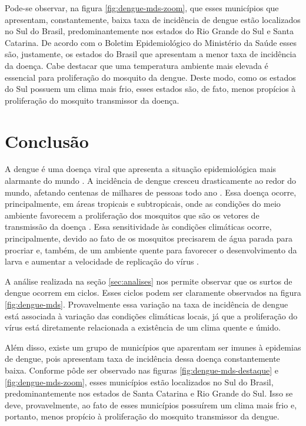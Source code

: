 \documentclass[12pt,openright,twoside,a4paper,article,brazil]{abntex2}
\begin{document}
Pode-se observar, na figura \ref{fig:dengue-mds-zoom}, que esses municípios que apresentam, constantemente, baixa taxa de incidência de dengue estão localizados no Sul do Brasil, predominantemente nos estados do Rio Grande do Sul e Santa Catarina. De acordo com o Boletim Epidemiológico do Ministério da Saúde esses são, justamente, os estados do Brasil que apresentam a menor taxa de incidência da doença\cite{ms-boletim-epidemiologico}. Cabe destacar que uma temperatura ambiente mais elevada é essencial para proliferação do mosquito da dengue\cite{effect-climate-dengue}. Deste modo, como os estados do Sul possuem um clima mais frio, esses estados são, de fato, menos propícios à proliferação do mosquito transmissor da doença.


\section{Conclusão}
\label{sec:conclusao}

A dengue é uma doença viral que apresenta a situação epidemiológica mais alarmante do mundo \cite{who-strategy-dengue-prevention}. A incidência de dengue cresceu drasticamente ao redor do mundo, afetando centenas de milhares de pessoas todo ano \cite{who-dengue-website}. Essa doença ocorre, principalmente, em áreas tropicais e subtropicais, onde as condições do meio ambiente favorecem a proliferação dos mosquitos que são os vetores de transmissão da doença \cite{ms-descricao-doenca}. Essa sensitividade às condições climáticas ocorre, principalmente, devido ao fato de os mosquitos precisarem de água parada para procriar e, também, de um ambiente quente para favorecer o desenvolvimento da larva e aumentar a velocidade de replicação do vírus \cite{effect-climate-dengue}.

A análise realizada na seção \ref{sec:analises} nos permite observar que os surtos de dengue ocorrem em ciclos. Esses ciclos podem ser claramente observados na figura \ref{fig:dengue-mds}. Provavelmente essa variação na taxa de incidência de dengue está associada à variação das condições climáticas locais, já que a proliferação do vírus está diretamente relacionada a existência de um clima quente e úmido.

Além disso, existe um grupo de municípios que aparentam ser imunes à epidemias de dengue, pois apresentam taxa de incidência dessa doença constantemente baixa. Conforme pôde ser observado nas figuras \ref{fig:dengue-mds-destaque} e \ref{fig:dengue-mds-zoom}, esses municípios estão localizados no Sul do Brasil, predominantemente nos estados de Santa Catarina e Rio Grande do Sul. Isso se deve, provavelmente, ao fato de esses municípios possuírem um clima mais frio e, portanto, menos propício à proliferação do mosquito transmissor da dengue.
\end{document}
